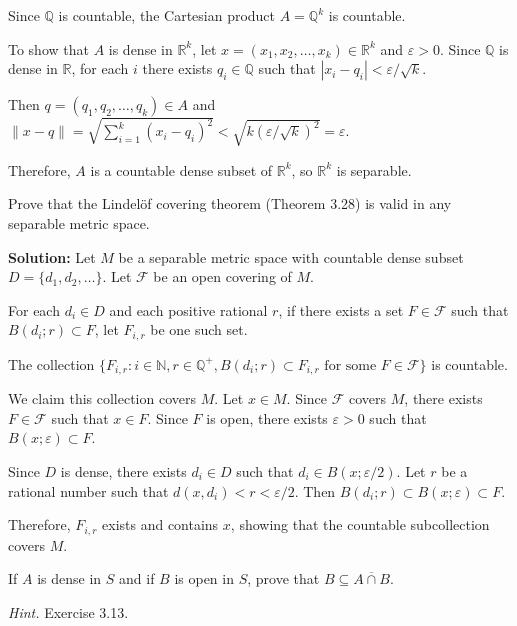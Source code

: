 Since $\mathbb{Q}$ is countable, the Cartesian product $A = \mathbb{Q}^k$ is countable.

To show that $A$ is dense in $\mathbb{R}^k$, let $x = (x_1, x_2, \ldots, x_k) \in \mathbb{R}^k$ and $\varepsilon > 0$. Since $\mathbb{Q}$ is dense in $\mathbb{R}$, for each $i$ there exists $q_i \in \mathbb{Q}$ such that $|x_i - q_i| < \varepsilon/\sqrt{k}$.

Then $q = (q_1, q_2, \ldots, q_k) \in A$ and $\|x - q\| = \sqrt{\sum_{i=1}^k (x_i - q_i)^2} < \sqrt{k(\varepsilon/\sqrt{k})^2} = \varepsilon$.

Therefore, $A$ is a countable dense subset of $\mathbb{R}^k$, so $\mathbb{R}^k$ is separable.

\begin{problembox}
Prove that the Lindelöf covering theorem (Theorem 3.28) is valid in any separable metric space.
\end{problembox}

\textbf{Solution:} Let $M$ be a separable metric space with countable dense subset $D = \{d_1, d_2, \ldots\}$. Let $\mathcal{F}$ be an open covering of $M$.

For each $d_i \in D$ and each positive rational $r$, if there exists a set $F \in \mathcal{F}$ such that $B(d_i;r) \subset F$, let $F_{i,r}$ be one such set.

The collection $\{F_{i,r} : i \in \mathbb{N}, r \in \mathbb{Q}^+, B(d_i;r) \subset F_{i,r} \text{ for some } F \in \mathcal{F}\}$ is countable.

We claim this collection covers $M$. Let $x \in M$. Since $\mathcal{F}$ covers $M$, there exists $F \in \mathcal{F}$ such that $x \in F$. Since $F$ is open, there exists $\varepsilon > 0$ such that $B(x;\varepsilon) \subset F$.

Since $D$ is dense, there exists $d_i \in D$ such that $d_i \in B(x;\varepsilon/2)$. Let $r$ be a rational number such that $d(x,d_i) < r < \varepsilon/2$. Then $B(d_i;r) \subset B(x;\varepsilon) \subset F$.

Therefore, $F_{i,r}$ exists and contains $x$, showing that the countable subcollection covers $M$.

\begin{problembox}
If \( A \) is dense in \( S \) and if \( B \) is open in \( S \), prove that \( B \subseteq \overline{A \cap B} \).

\textit{Hint.} Exercise 3.13.
\end{problembox}

